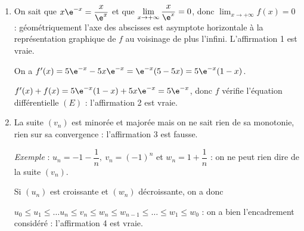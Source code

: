 \medskip

\begin{enumerate}
\item On sait que $x \e^{-x} = \dfrac{x}{\e^x}$ et que $\displaystyle\lim_{x \to + \infty} \dfrac{x}{\e^x} = 0$, donc $\displaystyle\lim_{x \to + \infty}  f(x) = 0$ : géométriquement l'axe des abscisses est asymptote horizontale à la représentation graphique de $f$ au voisinage de plus l'infini. L'affirmation 1 est vraie.

On a $f'(x) = 5\e^{-x}  - 5x\e^{-x} = \e^{-x}(5 - 5x) = 5\e^{-x}(1 - x)$.

$f'(x) + f(x) = 5\e^{-x}(1 - x) + 5x\e^{-x}  = 5\e^{-x}$, donc $f$ vérifie l'équation différentielle $(E)$ : l'affirmation 2 est vraie.
\item La suite $\left(v_n\right)$ est minorée et majorée mais on ne sait rien de sa monotonie, rien sur sa convergence : l'affirmation 3 est fausse.

\emph{Exemple} : $u_n = - 1 - \dfrac 1n, \: v_n = (-1)^n$ et $w_n = 1 + \dfrac 1n$ : on ne peut rien dire de la suite $\left(v_n\right)$.

Si $\left(u_n\right)$ est croissante et $\left(w_n\right)$ décroissante, on a donc 

$u_0 \leqslant u_1 \leqslant \ldots u_n \leqslant v_n \leqslant w_n \leqslant w_{n - 1} \leqslant \ldots \leqslant w_1 \leqslant w_0$ : on a bien l'encadrement considéré : l'affirmation 4 est vraie.
\end{enumerate}

\bigskip
